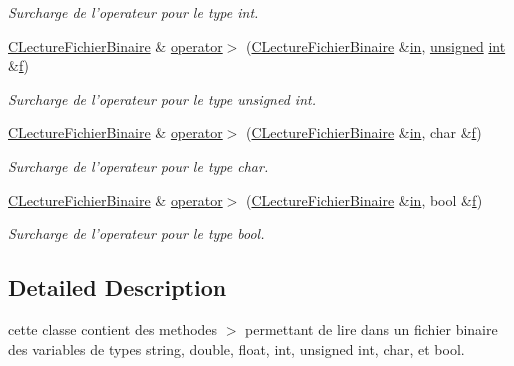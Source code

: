 \begin{DoxyCompactItemize}
\begin{DoxyCompactList}\small\item\em Surcharge de l'operateur pour le type {\itshape int}. \end{DoxyCompactList}\item 
\hyperlink{class_c_lecture_fichier_binaire}{C\-Lecture\-Fichier\-Binaire} \& \hyperlink{class_c_lecture_fichier_binaire_a10555985d21e9277fd610554eb804ad4}{operator$>$} (\hyperlink{class_c_lecture_fichier_binaire}{C\-Lecture\-Fichier\-Binaire} \&\hyperlink{glew_8h_a83ad0ee7f1e06b59c90271716e689080}{in}, \hyperlink{_free_image_8h_a425076c7067a1b5166e2cc530e914814}{unsigned} \hyperlink{wglew_8h_a500a82aecba06f4550f6849b8099ca21}{int} \&\hyperlink{glew_8h_a691492ec0bd6383f91200e49f6ae40ed}{f})
\begin{DoxyCompactList}\small\item\em Surcharge de l'operateur pour le type {\itshape unsigned} {\itshape int}. \end{DoxyCompactList}\item 
\hyperlink{class_c_lecture_fichier_binaire}{C\-Lecture\-Fichier\-Binaire} \& \hyperlink{class_c_lecture_fichier_binaire_a4a3ac4fa35e1f11664f6612d554d72bd}{operator$>$} (\hyperlink{class_c_lecture_fichier_binaire}{C\-Lecture\-Fichier\-Binaire} \&\hyperlink{glew_8h_a83ad0ee7f1e06b59c90271716e689080}{in}, char \&\hyperlink{glew_8h_a691492ec0bd6383f91200e49f6ae40ed}{f})
\begin{DoxyCompactList}\small\item\em Surcharge de l'operateur pour le type {\itshape char}. \end{DoxyCompactList}\item 
\hyperlink{class_c_lecture_fichier_binaire}{C\-Lecture\-Fichier\-Binaire} \& \hyperlink{class_c_lecture_fichier_binaire_aaf7fbfa5e060c1e9015b0ffbd013f3e3}{operator$>$} (\hyperlink{class_c_lecture_fichier_binaire}{C\-Lecture\-Fichier\-Binaire} \&\hyperlink{glew_8h_a83ad0ee7f1e06b59c90271716e689080}{in}, bool \&\hyperlink{glew_8h_a691492ec0bd6383f91200e49f6ae40ed}{f})
\begin{DoxyCompactList}\small\item\em Surcharge de l'operateur pour le type {\itshape bool}. \end{DoxyCompactList}\end{DoxyCompactItemize}


\subsection{Detailed Description}
cette classe contient des methodes $>$ permettant de lire dans un fichier binaire des variables de types string, double, float, int, unsigned int, char, et bool. 

